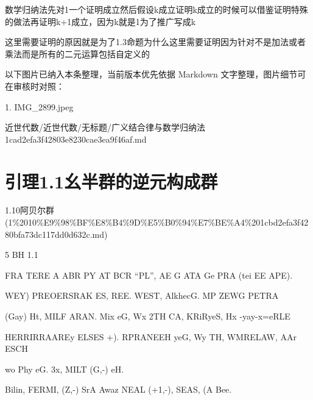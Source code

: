 \begin{note}[广义结合律与数学归纳法]

数学归纳法先对1一个证明成立然后假设k成立证明k成立的时候可以借鉴证明特殊的做法再证明k+1成立，因为k就是1为了推广写成k

这里需要证明的原因就是为了1.3命题为什么这里需要证明因为针对不是加法或者乘法而是所有的二元运算包括自定义的

\end{note}

\begin{note}[关联图片]
以下图片已纳入本条整理，当前版本优先依据 Markdown 文字整理，图片细节可在审核时对照：

1. IMG\_2899.jpeg\\

\end{note}

\begin{note}[来源路径]

近世代数/近世代数/无标题/广义结合律与数学归纳法 1cad2efa3f42803e8230cae3ea9f46af.md

\end{note}

\section*{引理1.1幺半群的逆元构成群}

\begin{note}[来源上级主题]

1.10阿贝尔群 (1\%2010\%E9\%98\%BF\%E8\%B4\%9D\%E5\%B0\%94\%E7\%BE\%A4\%201cbd2efa3f4280bfa73dc117dd0d632c.md)

\end{note}

\begin{lemma}[引理1.1幺半群的逆元构成群]

5 BH 1.1

FRA TERE A ABR PY AT BCR “PL”, AE G ATA Ge PRA (tei EE APE).

WEY) PREOERSRAK ES, REE. WEST, AlkhecG. MP ZEWG PETRA

(Gay) Ht, MILF ARAN. Mix eG, Wx 2TH CA, KRiRyeS, Hx -yay-x=eRLE

HERRIRRAAREy ELSES +). RPRANEEH yeG, Wy TH, WMRELAW, AAr ESCH

wo Phy eG. 3x, MILT (G,-) eH.

Bilin, FERMI, (Z,-) SrA Awaz NEAL (+1,-), SEAS, (A Bee.

\end{lemma}

